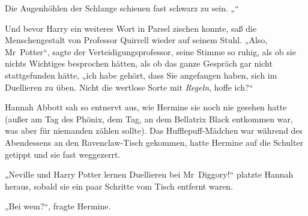 Die Augenhöhlen der Schlange schienen fast schwarz zu sein. „“

Und bevor Harry ein weiteres Wort in Parsel zischen konnte, saß die Menschengestalt von Professor Quirrell wieder auf seinem Stuhl. „Also, Mr~Potter“, sagte der Verteidigungsprofessor, seine Stimme so ruhig, als ob sie nichts Wichtiges besprochen hätten, als ob das ganze Gespräch gar nicht stattgefunden hätte, „ich habe gehört, dass Sie angefangen haben, sich im Duellieren zu üben. Nicht die wertlose Sorte mit \emph{Regeln}, hoffe ich?“

\later

Hannah Abbott sah so entnervt aus, wie Hermine sie noch nie gesehen hatte (außer am Tag des Phönix, dem Tag, an dem Bellatrix Black entkommen war, was aber für niemanden zählen sollte). Das Hufflepuff-Mädchen war während des Abendessens an den Ravenclaw-Tisch gekommen, hatte Hermine auf die Schulter getippt und sie fast weggezerrt.

„Neville und Harry Potter lernen Duellieren bei Mr~Diggory!“ platzte Hannah heraus, sobald sie ein paar Schritte vom Tisch entfernt waren.

„Bei wem?“, fragte Hermine.

